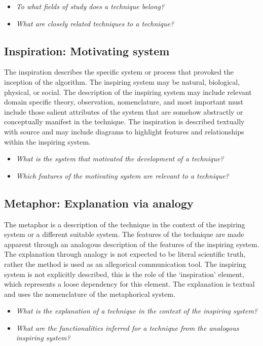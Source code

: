 \documentclass[a4paper, 11pt]{article}
\begin{document}
\begin{itemize}
	\item \emph{To what fields of study does a technique belong?}
	\item \emph{What are closely related techniques to a technique?}
\end{itemize}

\subsection{Inspiration: Motivating system}
The inspiration describes the specific system or process that provoked the inception of the algorithm. The inspiring system may be natural, biological, physical, or social. The description of the inspiring system may include relevant domain specific theory, observation, nomenclature, and most important must include those salient attributes of the system that are somehow abstractly or conceptually manifest in the technique. The inspiration is described textually with source and may include diagrams to highlight features and relationships within the inspiring system.

\begin{itemize}
	\item \emph{What is the system that motivated the development of a technique?}
	\item \emph{Which features of the motivating system are relevant to a technique?}
\end{itemize}

\subsection{Metaphor: Explanation via analogy}
The metaphor is a description of the technique in the context of the inspiring system or a different suitable system. The features of the technique are made apparent through an analogous description of the features of the inspiring system. The explanation through analogy is not expected to be literal scientific truth, rather the method is used as an allegorical communication tool. The inspiring system is not explicitly described, this is the role of the `inspiration' element, which represents a loose dependency for this element. The explanation is textual and uses the nomenclature of the metaphorical system. 

\begin{itemize}
	\item \emph{What is the explanation of a technique in the context of the inspiring system?}
	\item \emph{What are the functionalities inferred for a technique from the analogous inspiring system?}
\end{itemize}
\end{document}
